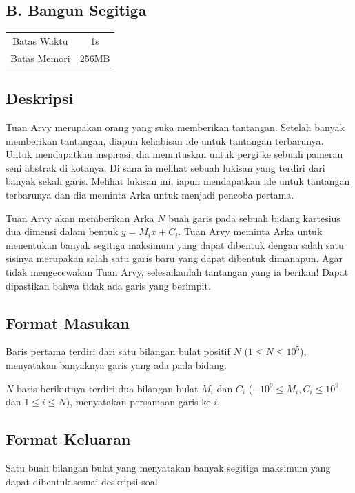 \documentclass{article}
\begin{document}
\begin{center}
    \section*{B. Bangun Segitiga} %

    \begin{tabular}{ | c c | }
        \hline
        Batas Waktu  & 1s \\    %
        Batas Memori & 256MB \\  %
        \hline
    \end{tabular}
\end{center}

\subsection*{Deskripsi}
Tuan Arvy merupakan orang yang suka memberikan tantangan. Setelah banyak memberikan tantangan, diapun kehabisan ide untuk tantangan terbarunya. Untuk mendapatkan inspirasi, dia memutuskan untuk pergi ke sebuah pameran seni abstrak di kotanya. Di sana ia melihat sebuah lukisan yang terdiri dari banyak sekali garis. Melihat lukisan ini, iapun mendapatkan ide untuk tantangan terbarunya dan dia meminta Arka untuk menjadi pencoba pertama.

Tuan Arvy akan memberikan Arka $N$ buah garis pada sebuah bidang kartesius dua dimensi dalam bentuk $y = M_ix + C_i$. Tuan Arvy meminta Arka untuk menentukan banyak segitiga maksimum yang dapat dibentuk dengan salah satu sisinya merupakan salah satu garis baru yang dapat dibentuk dimanapun. Agar tidak mengecewakan Tuan Arvy, selesaikanlah tantangan yang ia berikan! Dapat dipastikan bahwa tidak ada garis yang berimpit.

\subsection*{Format Masukan}
Baris pertama terdiri dari satu bilangan bulat positif $N$ ($1 \leq N \leq 10^5$), menyatakan banyaknya garis yang ada pada bidang.

$N$ baris berikutnya terdiri dua bilangan bulat $M_i$ dan $C_i$ ($-10^9 \leq M_i,C_i \leq 10^9$ dan $1 \leq i \leq N$), menyatakan persamaan garis ke-$i$.

\subsection*{Format Keluaran}
Satu buah bilangan bulat yang menyatakan banyak segitiga maksimum yang dapat dibentuk sesuai deskripsi soal.
\end{document}
